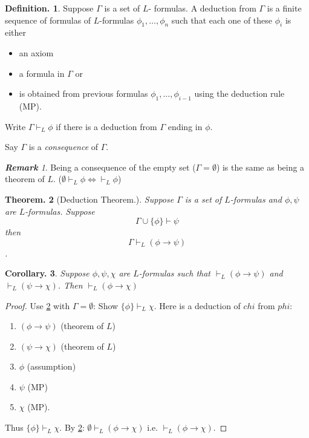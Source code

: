 \documentclass[a4paper,oneside,11pt,DIV=12,parskip=half]{scrartcl}
\theoremstyle{plain}
\newtheorem{theorem}{Theorem.}[section]
\newtheorem{corollary}[theorem]{Corollary.}
\theoremstyle{definition}
\newtheorem{definition}[theorem]{Definition.}
\newtheorem{remark, definition}[theorem]{Remark and Definition.}
\newtheorem{lemma, definition}[theorem]{Lemma and Definition.}
\newtheorem{theorem, definition}[theorem]{Theorem and Definition.}
\theoremstyle{remark}
\newtheorem*{remark}{\textbf{Remark}}
\newtheorem*{remark, example}{\textbf{Remark and Exercise}}
\begin{document}
\begin{definition}

Suppose $\Gamma$ is a set of $L$- formulas. A deduction from $\Gamma$ is a finite sequence of formulas of $L$-formulas $\phi_1,\dots,\phi_n$ such that each one of these $\phi_i$ is either
\begin{itemize}
    \item an axiom
    \item a formula in $\Gamma$ or
    \item is obtained from previous formulas $\phi_1,\dots,\phi_{i-1}$ using the deduction rule (MP).
\end{itemize}
Write $\Gamma \vdash_L \phi$ if there is a deduction from $\Gamma$ ending in $\phi$.

Say $\Gamma$ is a \emph{consequence} of $\Gamma$.
\end{definition}

\begin{remark}
Being a consequence of the empty set ($\Gamma = \emptyset$) is the same as being a theorem of $L$. ($\emptyset \vdash_L \phi \Leftrightarrow \vdash_L \phi$)
\end{remark}

\begin{theorem}[Deduction Theorem.]\label{Th:deductionL}
Suppose $\Gamma$ is a set of $L$-formulas and $\phi,\psi$ are $L$-formulas. Suppose
    \[ \Gamma \cup \{\phi\} \vdash \psi \] then
    \[ \Gamma \vdash_L (\phi \rightarrow \psi) \].
\end{theorem}

\begin{corollary}
Suppose $\phi,\psi,\chi$ are $L$-formulas such that $ \vdash_L (\phi \rightarrow \psi)$ and $ \vdash_L (\psi \rightarrow \chi)$. Then $ \vdash_L (\phi \rightarrow \chi)$
\end{corollary}

\begin{proof}
Use \ref{Th:deductionL} with $\Gamma = \emptyset$: Show $\{\phi\} \vdash_L \chi$. Here is a deduction of $chi$ from $phi$:
\begin{enumerate}
    \item $(\phi \rightarrow \psi)$ (theorem of $L$)
    \item $(\psi \rightarrow \chi)$ (theorem of $L$)
    \item $\phi$ (assumption)
    \item $\psi$ (MP)
    \item $\chi$ (MP).
\end{enumerate}
Thus $\{\phi\} \vdash_L \chi$.
By \ref{Th:deductionL}: $\emptyset \vdash_L (\phi \rightarrow \chi)$ i.e. $ \vdash_L (\phi \rightarrow \chi) $.
\end{proof}
\end{document}

